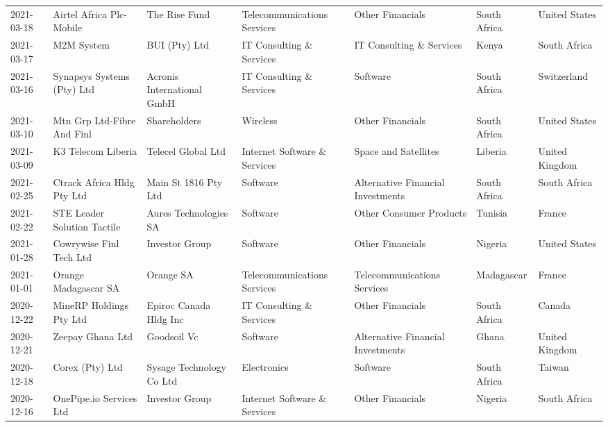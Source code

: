 \documentclass[11pt]{article}
\begin{document}
\begin{tabular}{lllllll}
	 2021-03-18 & Airtel Africa Plc-Mobile    & The Rise Fund                 & Telecommunications Services  & Other Financials                  & South Africa & United States \\
	 2021-03-17 & M2M System                  & BUI (Pty) Ltd                 & IT Consulting \& Services     & IT Consulting \& Services          & Kenya        & South Africa  \\
	 2021-03-16 & Synapsys Systems (Pty) Ltd  & Acronis International GmbH    & IT Consulting \& Services     & Software                          & South Africa & Switzerland   \\
	 2021-03-10 & Mtn Grp Ltd-Fibre And Finl  & Shareholders                  & Wireless                     & Other Financials                  & South Africa & United States \\
	 2021-03-09 & K3 Telecom Liberia          & Telecel Global Ltd            & Internet Software \& Services & Space and Satellites              & Liberia      & United Kingdom\\
	 2021-02-25 & Ctrack Africa Hldg Pty Ltd  & Main St 1816 Pty Ltd          & Software                     & Alternative Financial Investments & South Africa & South Africa  \\
	 2021-02-22 & STE Leader Solution Tactile & Aures Technologies SA         & Software                     & Other Consumer Products           & Tunisia      & France        \\
	 2021-01-28 & Cowrywise Finl Tech Ltd     & Investor Group                & Software                     & Other Financials                  & Nigeria      & United States \\
	 2021-01-01 & Orange Madagascar SA        & Orange SA                     & Telecommunications Services  & Telecommunications Services       & Madagascar   & France        \\
	 2020-12-22 & MineRP Holdings Pty Ltd     & Epiroc Canada Hldg Inc        & IT Consulting \& Services     & Other Financials                  & South Africa & Canada        \\
	 2020-12-21 & Zeepay Ghana Ltd            & Goodsoil Vc                   & Software                     & Alternative Financial Investments & Ghana        & United Kingdom\\
	 2020-12-18 & Corex (Pty) Ltd             & Sysage Technology Co Ltd      & Electronics                  & Software                          & South Africa & Taiwan        \\
	 2020-12-16 & OnePipe.io Services Ltd     & Investor Group                & Internet Software \& Services & Other Financials                  & Nigeria      & South Africa  \\

\end{tabular}
\end{document}
